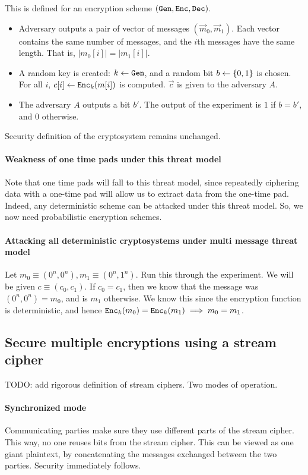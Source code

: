 This is defined for an encryption scheme $(\texttt{Gen}, \texttt{Enc}, \texttt{Dec})$.
\begin{itemize}
\item Adversary outputs a pair of vector of messages $(\vec m_0, \vec m_1)$. Each
    vector contains the same number of messages, and the $i$th messages have the
    same length. That is, $|m_0[i]| = |m_1[i]|$.
\item A random key is created: $ k \leftarrow \texttt{Gen}$, and a random bit
    $b \leftarrow \{0, 1\}$ is chosen. For all $i$, $c[i] \leftarrow \texttt{Enc}_k(m[i])$
    is computed. $\vec c$ is given to the adversary $A$.
\item The adversary $A$ outputs a bit $b'$. The output of the experiment is $1$
    if $b = b'$, and $0$ otherwise.
\end{itemize}

Security definition of the cryptosystem remains unchanged.


\paragraph{Weakness of one time pads under this threat model}
Note that one time pads will fall to this threat model, since repeatedly
ciphering data with a one-time pad will allow us to extract data from the
one-time pad. Indeed, any deterministic scheme can be attacked under
this threat model. So, we now need probabilistic encryption schemes.

\paragraph{Attacking all deterministic cryptosystems under multi message threat model}
Let $m_0 \equiv (0^n, 0^n), m_1 \equiv (0^n, 1^n)$. Run this through the experiment. We will
be given $c \equiv (c_0, c_1)$. If $c_0 = c_1$, then  we know that the message
was $(0^n, 0^n) = m_0$, and is $m_1$ otherwise. We know this since the encryption
function is deterministic, and  hence $\texttt{Enc}_k(m_0) = \texttt{Enc}_k(m_1) \implies m_0 = m_1$.

\subsection{Secure multiple encryptions using a stream cipher}
TODO: add rigorous definition of stream ciphers.
Two modes of operation.

\paragraph{Synchronized mode} Communicating parties make sure they use
different parts of the stream cipher. This way, no one reuses bits from the
stream cipher. This can be viewed as one giant plaintext, by concatenating
the messages exchanged between the two parties. Security immediately follows.

